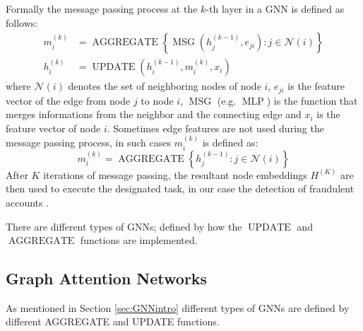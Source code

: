 Formally the message passing process at the $k$-th layer in a GNN is defined as follows:
\begin{equation}
\begin{aligned}
m_i^{(k)} &= \operatorname{AGGREGATE} \left\{ \operatorname{MSG}\left( h_j^{(k-1)},e_{ji}\right) : j \in \mathcal{N}(i) \right\} \\
h_i^{(k)} &= \operatorname{UPDATE} \left( h_i^{(k-1)}, m_i^{(k)}, x_i \right)
\end{aligned}
\end{equation}
where $\mathcal{N}(i)$ denotes the set of neighboring nodes of node $i$, $e_{ji}$ is the feature vector of the edge from node $j$ to node $i$, \(\operatorname{MSG}\) (e.g. \(\operatorname{MLP}\)) is the function that merges informations from the neighbor and the connecting edge and $x_i$ is the feature vector of node $i$.
Sometimes edge features are not used during the message passing process, in such cases \(m_i^{(k)}\) is defined as: 
\begin{equation}
    m_i^{(k)} = \operatorname{AGGREGATE} \left\{ h_j^{(k-1)} : j \in \mathcal{N}(i) \right\}
\end{equation}
After $K$ iterations of message passing, the resultant node embeddings $H^{(K)}$ are then used to execute the designated task, in our case the detection of fraudulent accounts \cite{Cheng_2025}. 

There are different types of GNNs; defined by how the \( \operatorname{UPDATE}\) and \( \operatorname{AGGREGATE}\) functions are implemented.

\subsection{Graph Attention Networks}
\label{sec:gat}

As mentioned in Section \ref{sec:GNNintro} different types of GNNs are defined by different AGGREGATE and UPDATE functions.

